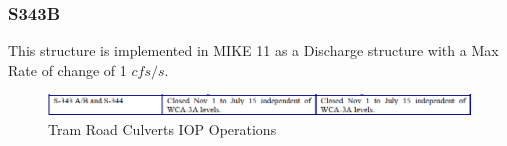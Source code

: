 %
%
%

\clearpage

\subsubsection{S343B}

This structure is implemented in MIKE 11 as a Discharge structure with a Max Rate of change of 1 $cfs/s$.

\begin{figure}[!h]
  \begin{center}
  \includegraphics[width=6.5in]{../figs/S343-S344_IOPops.png}
  \caption{Tram Road Culverts IOP Operations}
  \label{fig:343iop}
  \end{center}
\end{figure}

